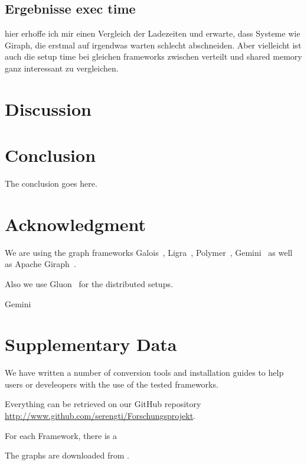 \documentclass[conference,a4paper]{IEEEtran}
\begin{document}
\subsection{Ergebnisse exec time}
hier erhoffe ich mir einen Vergleich der Ladezeiten und erwarte, dass Systeme wie Giraph, die erstmal auf irgendwas warten schlecht abschneiden.
Aber vielleicht ist auch die setup time bei gleichen frameworks zwischen verteilt und shared memory ganz interessant zu vergleichen.



\section{Discussion}




\section{Conclusion}
The conclusion goes here.



\section*{Acknowledgment}
We are using the graph frameworks Galois~\cite{Galois}, Ligra~\cite{Ligra}, Polymer~\cite{Polymer}, Gemini~\cite{Gemini} as well as Apache Giraph~\cite{Giraph}.

Also we use Gluon~\cite{vertGalois} for the distributed setups.

Gemini~\cite{Gemini}

\section*{Supplementary Data}\label{supplementaryData}
We have written a number of conversion tools and installation guides to help
users or develeopers with the use of the tested frameworks.

Everything can be retrieved on our GitHub repository
\url{http://www.github.com/serengti/Forschungsprojekt}.

For each Framework, there is a


The graphs are downloaded from \cite{konect}.



\end{document}
